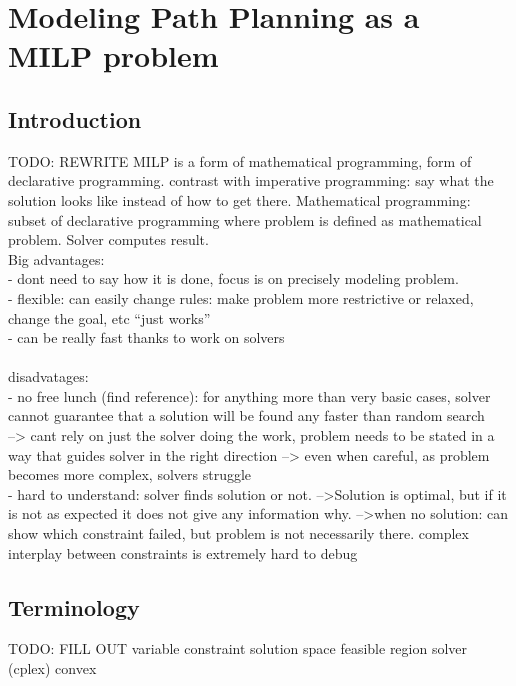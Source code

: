 \section{Modeling Path Planning as a MILP problem}
\label{section:modelingbasic}
\subsection{Introduction}
TODO: REWRITE
MILP is a form of mathematical programming, form of declarative programming. contrast with imperative programming: say what the solution looks like instead of how to get there. Mathematical programming: subset of declarative programming where problem is defined as mathematical problem. Solver computes result.\\
Big advantages: \\
- dont need to say how it is done, focus is on precisely modeling problem.\\
- flexible: can easily change rules: make problem more restrictive or relaxed, change the goal, etc ``just works''\\
- can be really fast thanks to work on solvers\\
\\
disadvatages:\\
- no free lunch (find reference): for anything more than very basic cases, solver cannot guarantee that a solution will be found any faster than random search\\
	--> cant rely on just the solver doing the work, problem needs to be stated in a way that guides solver in the right direction
	--> even when careful, as problem becomes more complex, solvers struggle\\
-  hard to understand: solver finds solution or not.
	-->Solution is optimal, but if it is not as expected it does not give any information why.
	-->when no solution: can show which constraint failed, but problem is not necessarily there. complex interplay between constraints is extremely hard to debug\\


\subsection{Terminology}
TODO: FILL OUT
variable
constraint
solution space
feasible region
solver (cplex)
convex

